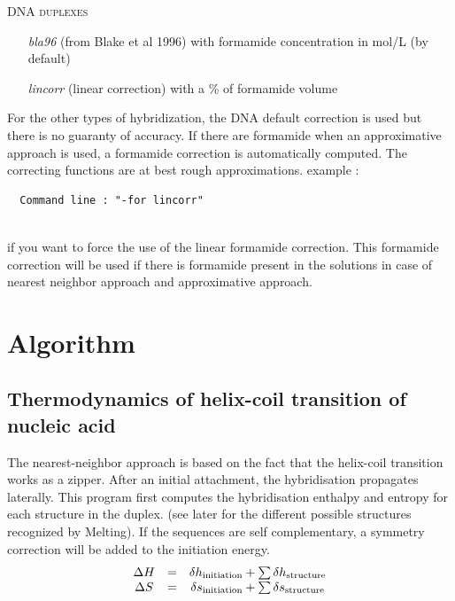 \documentclass{article}
\begin{document}
\begin{description}
  \textsc{DNA duplexes}
    \begin{itemize}
    \item [\textit{bla96}] (from Blake et al 1996) with formamide concentration in mol/L  (by default)
    \item [\textit{lincorr}] (linear correction) with a \% of formamide volume		  	 
    \end{itemize}
  For the other types of hybridization, the DNA default correction is used but there is no guaranty of accuracy.
  If there are formamide when an approximative approach is used, a formamide correction is automatically computed.
  The correcting functions are  at  best rough  approximations.
  example :
  
  \begin{verbatim}
  Command line : "-for lincorr" 
  
  \end{verbatim}
  if you want to force the use of the linear formamide correction. This formamide correction will be used if there is formamide 
  present in the solutions in case of nearest neighbor approach and approximative approach. 
\end{description}

 
\section{Algorithm }
  

\subsection{Thermodynamics of helix-coil transition of nucleic acid}  

The nearest-neighbor approach is based on the fact that the helix-coil
transition works as a zipper. After an initial attachment, the hybridisation
propagates laterally. This program first computes the hybridisation enthalpy 
and entropy for each structure in the duplex. (see later for the different possible
structures recognized by Melting). If the sequences are self complementary, a 
symmetry correction will be added to the initiation energy.
\begin{displaymath}
  \begin{array}[t]{ccc}
  \Delta{}H&=&\delta{}h_\mathrm{initiation}+\sum \delta{}h_\mathrm{structure}\\
  \Delta{}S&=&\delta{}s_\mathrm{initiation}+\sum \delta{}s_\mathrm{structure}
  \end{array}
\end{displaymath} 
\end{document}
